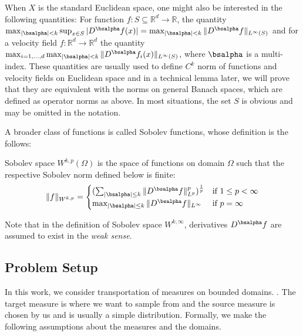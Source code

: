 {When $X$ is the standard Euclidean space, one might also be interested in the following quantities:
For function $f: S\subseteq\mathbb{R}^d\rightarrow\mathbb{R}$, the quantity $\max_{|\bsalpha|<k} \sup_{x\in S}|D^\bsalpha f(x)| = \max_{|\bsalpha|<k}\|D^\bsalpha f\|_{L^\infty(S)}$ and for a velocity field $f: \mathbb{R}^d\rightarrow\mathbb{R}^d$ the quantity $\max_{i = 1, ..., d}\max_{|\bsalpha|<k} \|D^\bsalpha f_i(x)\|_{L^\infty(S)}$, where $\bsalpha$ is a multi-index. These quantities are usually used to define $C^k$ norm of functions and velocity fields on Euclidean space and in a technical lemma later, we will prove that they are equivalent with the norms on general Banach spaces, which are defined as operator norms as above. 
In most situations, the set $S$ is obvious and may be omitted in the notation. 

A broader class of functions is called Sobolev functions, whose definition is the follows: 
\begin{definition}
Sobolev space $W^{k,p}(\Omega)$ is the space of functions on domain $\Omega$ such that the respective Sobolev norm defined below is finite:
\begin{equation}
  \|f\|_{W^{k, p}} =
    \begin{cases}
      (\sum_{|\bsalpha|\leq k} \|D^\bsalpha f\|^p_{L^p})^\frac{1}{p} & \text{if $ 1\leq p < \infty$}\\
      \max_{|\bsalpha|\leq k} \|D^\bsalpha f\|_{L^\infty}& \text{if $ p = \infty$}
    \end{cases}       
\end{equation}
\end{definition}
Note that in the definition of Sobolev space $W^{k, \infty}$, derivatives $D^\bsalpha f$ are assumed to exist in the \textit{weak sense}.




}
\subsection{Problem Setup}\label{sec:setup}
In this work, we consider transportation of measures on bounded
domains. . The
target measure is where we want to sample from and the source measure
is chosen by us and is usually a simple distribution. Formally, we make the following assumptions about the measures and the domains.

